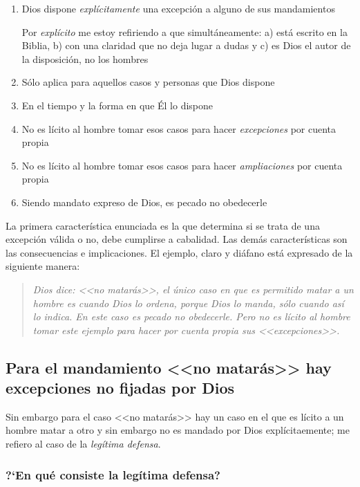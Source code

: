 \documentclass{article}
\begin{document}
\begin{enumerate}
\item Dios dispone \emph{expl\'{i}citamente} una excepci\'on a alguno de sus mandamientos
    
    Por \emph{expl\'{i}cito} me estoy refiriendo a que simult\'aneamente: a) est\'a escrito en la Biblia, b) con una claridad que no deja lugar a dudas y c) es Dios el autor de la disposici\'on, no los hombres

\item S\'olo aplica para aquellos casos y personas que Dios dispone
\item En el tiempo y la forma en que \'El lo dispone
\item No es l\'{i}cito al hombre tomar esos casos para hacer \emph{excepciones} por cuenta propia
\item No es l\'{i}cito al hombre tomar esos casos para hacer \emph{ampliaciones} por cuenta propia
\item Siendo mandato expreso de Dios, es pecado no obedecerle
\end{enumerate}

\noindent
La primera caracter\'{i}stica enunciada es la que determina si se trata de una excepci\'on v\'alida o no, debe cumplirse a cabalidad. Las dem\'as caracter\'{i}sticas son las consecuencias e implicaciones. El ejemplo, claro y di\'afano est\'a expresado de la siguiente manera:

\begin{quote}
\emph{Dios dice: <<no matar\'as>>, el \'unico caso en que es permitido matar a un hombre es cuando Dios lo ordena, porque Dios lo manda, s\'olo cuando as\'{i} lo indica. En este caso es pecado no obedecerle. Pero no es l\'{i}cito al hombre tomar este ejemplo para hacer por cuenta propia sus <<excepciones>>.}
\end{quote}

\subsection{Para el mandamiento <<no matar\'as>> hay excepciones no fijadas por Dios}

Sin embargo para el caso <<no matar\'as>> hay un caso en el que es l\'{i}cito a un hombre matar a otro y sin embargo no es mandado por Dios expl\'{i}citaemente; me refiero al caso de la \emph{leg\'{i}tima defensa}.

\subsubsection{?`En qu\'e consiste la leg\'{i}tima defensa?}
\end{document}
